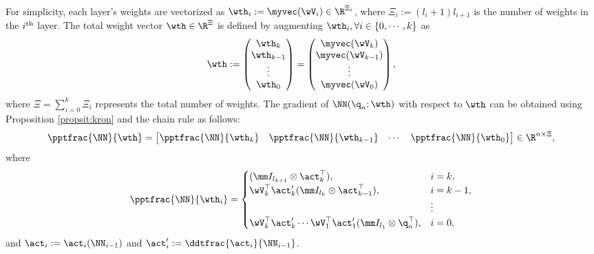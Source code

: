 \documentclass[journal]{IEEEtran}
\begin{document}
For simplicity, each layer's weights are vectorized as $\wth_i:=\myvec(\wV_i)\in\R^{\Xi_i}$, where $\Xi_i:= (l_i+1)l_{i+1}$ is the number of weights in the $i\textsuperscript{th}$ layer. 
The total weight vector $\wth\in\R^{\Xi}$ is defined by augmenting $\wth_i, \forall i\in \{0,\cdots,k\}$ as 
\begin{equation}
    \wth := 
    \begin{pmatrix}
        \wth_k\\
        \wth_{k-1}\\
        \vdots\\
        \wth_0
    \end{pmatrix}
    =
    \begin{pmatrix}
        \myvec(\wV_k)\\
        \myvec(\wV_{k-1})\\
        \vdots\\
        \myvec(\wV_0)
    \end{pmatrix},
\end{equation}
where $\Xi={\sum_{i=0}^{k} \Xi_i}$ represents the total number of weights. 
The gradient of $ \NN({\q}_n;\wth)$ with respect to $\wth$ can be obtained using Proposition \ref{propsit:kron} and the chain rule as follows:
\begin{equation}
    \pptfrac{\NN}{\wth}=
    \begin{bmatrix}
        \pptfrac{\NN}{\wth_k}&
        \pptfrac{\NN}{\wth_{k-1}}&
    \cdots &
        \pptfrac{\NN}{\wth_0}
    \end{bmatrix}
    \in\R^{n \times \Xi}
    ,
    \label{eq:gradient:phi}
\end{equation}
where
\begin{equation}
    \pptfrac{\NN}{\wth_i} = 
    \begin{cases}
        (
            \mm I_{l_{k+1}}
            \otimes 
            \act_{k}^\top  
        )
        , 
        &
        i=k
        ,
        \\
        \wV_k^\top\act_{k}' 
        (
            \mm I_{l_{k}}
            \otimes  
            \act_{k-1}^\top  
        )
        , 
        & 
        i=k-1
        ,
        \\
        &
        \vdots 
        \\
        \wV_k^\top\act'_{k} 
        \cdots 
        \wV_1^\top\act_1' 
        (
            \mm I_{l_1}
            \otimes 
            {\q}_n^\top  
        )
        , 
        &
        i = 0
        ,
    \end{cases}
    \label{eq:NN:grad}
\end{equation}
and $\act_i:= \act_i(\NN_{i-1})$ and $\act_i':= \ddtfrac{\act_i}{\NN_{i-1}}$.
\end{document}
